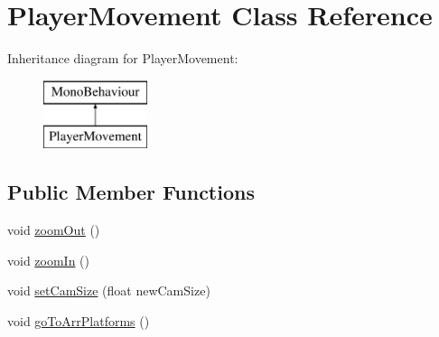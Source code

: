 \hypertarget{class_player_movement}{}\section{Player\+Movement Class Reference}
\label{class_player_movement}
Inheritance diagram for Player\+Movement\+:\begin{figure}[H]
\begin{center}
\leavevmode
\includegraphics[height=2.000000cm]{class_player_movement}
\end{center}
\end{figure}
\subsection*{Public Member Functions}
\begin{DoxyCompactItemize}
\item 
void \hyperlink{class_player_movement_a4801b0f4bea995d557faf3e0cf004b8b}{zoom\+Out} ()
\item 
void \hyperlink{class_player_movement_a86dee8b90e483c36b7190c80a53a4163}{zoom\+In} ()
\item 
void \hyperlink{class_player_movement_a53e0613db4bf57eb5edc2b9dacd7bfe5}{set\+Cam\+Size} (float new\+Cam\+Size)
\item 
void \hyperlink{class_player_movement_abd415fe1fd1e33f5fe5c28fa9ad97399}{go\+To\+Arr\+Platforms} ()
\end{DoxyCompactItemize}
